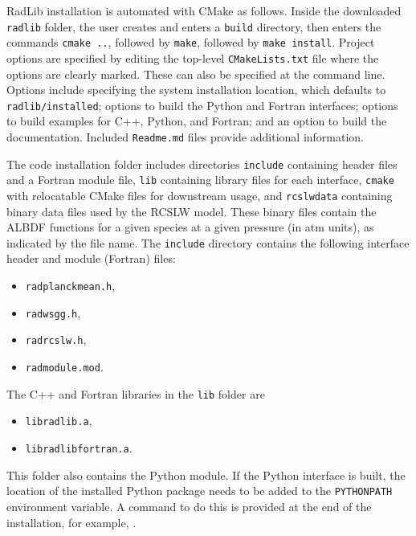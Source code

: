 \documentclass[preprint,12pt]{elsarticle}
\begin{document}
RadLib installation is automated with CMake as follows. Inside the downloaded \texttt{radlib} folder, the user creates and enters a \texttt{build} directory, then enters the commands \texttt{cmake ..}, followed by \texttt{make}, followed by \texttt{make install}. Project options are specified by editing the top-level \texttt{CMakeLists.txt} file where the options are clearly marked. These can also be specified at the command line. Options include specifying the system installation location, which defaults to \texttt{radlib/installed}; options to build the Python and Fortran interfaces; options to build examples for C++, Python, and Fortran; and an option to build the documentation. Included \texttt{Readme.md} files provide additional information.

The code installation folder includes directories \texttt{include} containing header files and a Fortran module file, \texttt{lib} containing library files for each interface, \texttt{cmake} with relocatable CMake files for downstream usage, and \texttt{rcslw\textunderscore data} containing binary data files used by the RCSLW model. These binary files contain the ALBDF functions for a given species at a given pressure (in atm units), as indicated by the file name. The \texttt{include} directory contains the following interface header and module (Fortran) files:
%
\begin{itemize}
    \item \texttt{rad\textunderscore planck\textunderscore mean.h},
    \item \texttt{rad\textunderscore wsgg.h},
    \item \texttt{rad\textunderscore rcslw.h},
    \item \texttt{rad\textunderscore module.mod}.
\end{itemize}
%
The C++ and Fortran libraries in the \texttt{lib} folder are
\begin{itemize}
    \item \texttt{libradlib.a},
    \item \texttt{libradlib\textunderscore fortran.a}.
\end{itemize}
%
This folder also contains the Python module. If the Python interface is built, the location of the installed Python package needs to be added to the \texttt{PYTHONPATH} environment variable. A command to do this is provided at the end of the installation, for example, \texttt{}.
\end{document}
